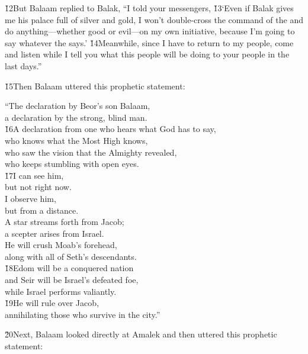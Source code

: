 \v{12}But Balaam replied to Balak, ``I told your messengers, \v{13}`Even if Balak gives me his palace full of silver and gold, I won't double-cross the command of the  and do anything---whether good or evil---on my own initiative, because I'm going to say whatever the  says.' \v{14}Meanwhile, since I have to return to my people, come and listen while I tell you what this people will be doing to your people in the last days.''

\v{15}Then Balaam uttered this prophetic statement:

\begin{poetry}
\poeml ``The declaration by Beor's son Balaam, \\
\poemll    a declaration by the strong, blind man. \\
\poeml \v{16}A declaration from one who hears what God has to say, \\
\poemll    who knows what the Most High knows, \\
\poeml who saw the vision that the Almighty revealed, \\
\poemll    who keeps stumbling with open eyes. \\
\poeml \v{17}I can see him, \\
\poemll    but not right now. \\
\poeml I observe him, \\
\poemll    but from a distance. \\
\poeml A star streams forth from Jacob; \\
\poemll    a scepter arises from Israel. \\
\poeml He will crush Moab's forehead, \\
\poemll    along with all of Seth's descendants. \\
\poeml \v{18}Edom will be a conquered nation \\
\poemll    and Seir will be Israel's defeated foe, \\
\poemlll       while Israel performs valiantly. \\
\poeml \v{19}He will rule over Jacob, \\
\poemll    annihilating those who survive in the city.''
\end{poetry}

\v{20}Next, Balaam looked directly at Amalek and then uttered this prophetic statement:

